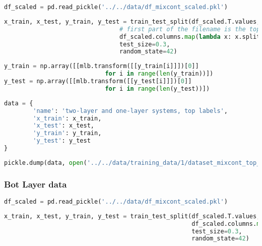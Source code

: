 \begin{lstlisting}[language=Python]
df_scaled = pd.read_pickle('../../data/df_mixcont_scaled.pkl')
\end{lstlisting}

\begin{lstlisting}[language=Python]
x_train, x_test, y_train, y_test = train_test_split(df_scaled.T.values,
                                # first part of the filename is the top label
                                df_scaled.columns.map(lambda x: x.split('_')[0]), 
                                test_size=0.3,
                                random_state=42)
\end{lstlisting}

\begin{lstlisting}[language=Python]
y_train = np.array([[mlb.transform([[y_train[i]]])[0]] 
                            for i in range(len(y_train))])
y_test = np.array([[mlb.transform([[y_test[i]]])[0]] 
                            for i in range(len(y_test))])
\end{lstlisting}

\begin{lstlisting}[language=Python]
data = {
        'name': 'two-layer and one-layer systems, top labels',
        'x_train': x_train,
        'x_test': x_test,
        'y_train': y_train,
        'y_test': y_test
}
\end{lstlisting}

\begin{lstlisting}[language=Python]
pickle.dump(data, open('../../data/training_data/1/dataset_mixcont_top_layer.pkl', 'wb'))
\end{lstlisting}

\hypertarget{bot-layer-data}{%
\subsubsection*{Bot Layer data}\label{bot-layer-data}}

\begin{lstlisting}[language=Python]
df_scaled = pd.read_pickle('../../data/df_mixcont_scaled.pkl')
\end{lstlisting}

\begin{lstlisting}[language=Python]
x_train, x_test, y_train, y_test = train_test_split(df_scaled.T.values,
                                                    df_scaled.columns.map(lambda x: x.split('_')[1]), # second part of the filename is the bot label
                                                    test_size=0.3,
                                                    random_state=42)
\end{lstlisting}

